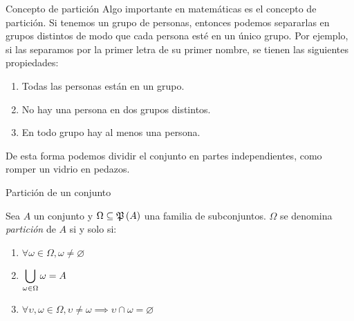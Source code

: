 \begin{frame}{Concepto de partición}
	Algo importante en matemáticas es el concepto de partición. Si tenemos un grupo de personas, entonces podemos separarlas en grupos distintos de modo que cada persona esté en un único grupo. Por ejemplo, si las separamos por la primer letra de su primer nombre, se tienen las siguientes propiedades:
	\begin{enumerate}
		\item Todas las personas están en un grupo.
		\item No hay una persona en dos grupos distintos.
		\item En todo grupo hay al menos una persona.
	\end{enumerate}
	De esta forma podemos dividir el conjunto en partes independientes, como romper un vidrio en pedazos.
\end{frame}
\begin{frame}{Partición de un conjunto}
	\begin{mdefinition}[Partición]
		Sea $ A $ un conjunto y $ \Omega\subseteq\mpow{A} $ una familia de subconjuntos. $ \Omega $ se denomina \emph{partición} de $ A $ si y solo si:
		\begin{enumerate}
			\item $ \forall\omega\in\Omega, \omega\neq\varnothing $
			\item $ \displaystyle\bigcup_{\omega\in\Omega}\omega = A $
			\item $ \forall \upsilon, \omega\in\Omega, \upsilon\neq\omega\implies\upsilon\cap\omega =\varnothing $
		\end{enumerate}
	\end{mdefinition}
\end{frame}
